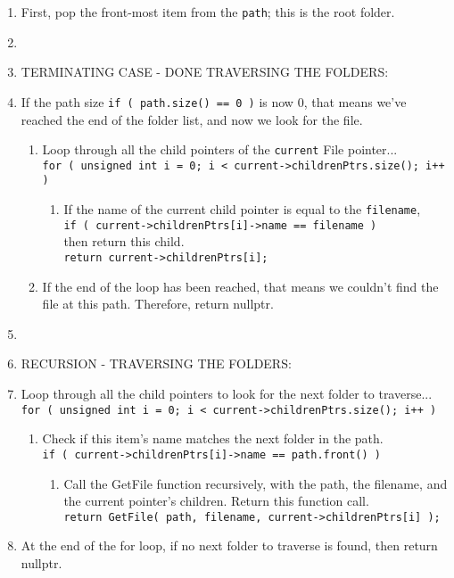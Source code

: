 \documentclass[a4paper,12pt,oneside]{book}
\begin{document}
\begin{enumerate}
    \item   First, pop the front-most item from the \texttt{path}; this is the root folder.


    \item[]
    \item[] TERMINATING CASE - DONE TRAVERSING THE FOLDERS:
    \item   If the path size \texttt{if ( path.size() == 0 )} is now 0,
            that means we've reached the end of the folder list, and now we look for the file.
            
    \begin{enumerate}
        \item   Loop through all the child pointers of the \texttt{current} File pointer... \\
            \footnotesize 
                \texttt{for ( unsigned int i = 0; i < current->childrenPtrs.size(); i++ )}
            \normalsize 
                
        \begin{enumerate}
            \item   If the name of the current child pointer is equal to the \texttt{filename}, \\
                \texttt{if ( current->childrenPtrs[i]->name == filename )} \\
                then return this child. \\ \texttt{return current->childrenPtrs[i];}
        \end{enumerate}
        \item   If the end of the loop has been reached, that means we couldn't find the file at this path.
                Therefore, return nullptr.
    \end{enumerate}
    
    \item[]
    \item[] RECURSION - TRAVERSING THE FOLDERS:
    \item   Loop through all the child pointers to look for the next folder to traverse... \\
            \footnotesize 
            \texttt{for ( unsigned int i = 0; i < current->childrenPtrs.size(); i++ )}
            \normalsize 
    \begin{enumerate}
        \item   Check if this item's name matches the next folder in the path. \\
                \texttt{if ( current->childrenPtrs[i]->name == path.front() )}
            \begin{enumerate}
                \item   Call the GetFile function recursively, with the path, the filename,
                        and the current pointer's children. Return this function call. \\
                        \footnotesize 
                        \texttt{return GetFile( path, filename, current->childrenPtrs[i] );}
                        \normalsize 
            \end{enumerate}
    \end{enumerate}

    \item   At the end of the for loop, if no next folder to traverse is found, then return nullptr.
\end{enumerate}
\end{document}
